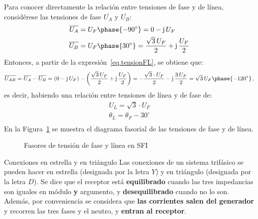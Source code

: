 \documentclass[11pt]{book} %
\makeatletter
\numberwithin{dummy}{section}
\theoremstyle{ocrenumbox}
\theoremstyle{blacknumex}
\theoremstyle{blacknumbox}
\theoremstyle{ocrenum}
\renewcommand{\section}{\@startsection{section}{1}{\z@}
{-4ex \@plus -1ex \@minus -.4ex}
{1ex \@plus.2ex }
{\normalfont\large\sffamily\bfseries}}
\makeatother
\begin{document}
	Para conocer directamente la relación entre tensiones de fase y de línea, considérese las tensiones de fase $\overline{U_A}$ y $\overline{U_B}$: 
	\begin{align*}
		\overline{U_A} &= U_F\phase{-90^\circ}=0-\mathrm{j}\,U_F
		\\
		\overline{U_B} &= U_F\phase{30^\circ}=\dfrac{\sqrt{3}\,U_F}{2}+\mathrm{j}\,\dfrac{U_F}{2}
	\end{align*}
	Entonces, a partir de la expresión~\eqref{eq.tensionFL}, se obtiene que: 
	\begin{equation*}
		\overline{U_{AB}}=\overline{U_{A}}-\overline{U_{B}}=(0-\mathrm{j}\,U_F)-\left(\dfrac{\sqrt{3}\,U_F}{2}+\mathrm{j}\,\dfrac{U_F}{2}\right)=-\dfrac{\sqrt{3}\cdot U_F}{2}-\mathrm{j}\,\dfrac{3\,U_F}{2}=\sqrt{3}\,U_F \phase{-120^\circ}\,,
	\end{equation*}
	es decir, habiendo una relación entre tensiones de línea y de fase de: 
	\begin{equation}
		\boxed{
			\begin{array}{l}
				U_L = \sqrt{3}\cdot U_F\\
				\theta_L = \theta_F - 30^\circ\\
			\end{array}
		} 
	\end{equation}
	En la Figura~\ref{fig.linea-fase-SFI} se muestra el diagrama fasorial de las tensiones de fase y de línea. 

	\begin{figure}[htbp]
		\centering
		\hfil
		\caption{Fasores de tensión de fase y línea en SFI}
		\label{fig.linea-fase-SFI}
	\end{figure}
	
	
	
	
	
	
	
	
	\section{Conexiones en estrella y en triángulo}\label{sec.conexiones}
	Las conexiones de un sistema trifásico se pueden hacer en estrella (designada por la letra $Y$) y en triángulo (designada por la letra $D$). Se dice que el receptor está \textbf{equilibrado} cuando las tres impedancias son iguales en módulo \textbf{y} argumento, y \textbf{desequilibrado} cuando no lo son. Además, por conveniencia se considera que \textbf{las corrientes salen del generador} y recorren las tres fases y el neutro, y \textbf{entran al receptor}.
	
\end{document}
